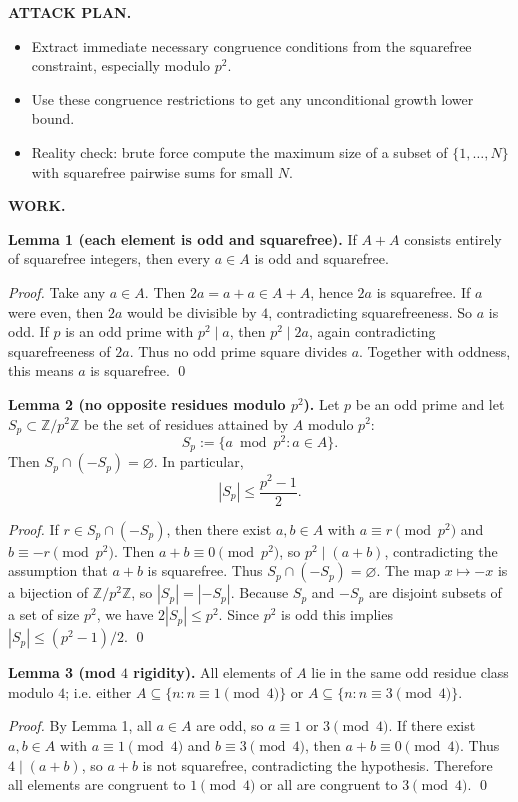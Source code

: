 \medskip
\noindent\textbf{ATTACK PLAN.}
\begin{itemize}
\item Extract immediate necessary congruence conditions from the squarefree constraint, especially modulo $p^2$.
\item Use these congruence restrictions to get any unconditional growth lower bound.
\item Reality check: brute force compute the maximum size of a subset of $\{1,\dots,N\}$ with squarefree pairwise sums for small $N$.
\end{itemize}

\medskip
\noindent\textbf{WORK.}

\medskip
\noindent\textbf{Lemma 1 (each element is odd and squarefree).}
If $A+A$ consists entirely of squarefree integers, then every $a\in A$ is odd and squarefree.

\noindent\emph{Proof.}
Take any $a\in A$. Then $2a=a+a\in A+A$, hence $2a$ is squarefree.
If $a$ were even, then $2a$ would be divisible by $4$, contradicting squarefreeness.
So $a$ is odd.
If $p$ is an odd prime with $p^2\mid a$, then $p^2\mid 2a$, again contradicting squarefreeness of $2a$.
Thus no odd prime square divides $a$.
Together with oddness, this means $a$ is squarefree. \qed

\medskip
\noindent\textbf{Lemma 2 (no opposite residues modulo $p^2$).}
Let $p$ be an odd prime and let $S_p\subset\mathbb Z/p^2\mathbb Z$ be the set of residues attained by $A$ modulo $p^2$:
\[S_p:=\{a\bmod p^2: a\in A\}.
\]
Then $S_p\cap(-S_p)=\varnothing$. In particular,
\[|S_p|\le \frac{p^2-1}{2}.
\]

\noindent\emph{Proof.}
If $r\in S_p\cap(-S_p)$, then there exist $a,b\in A$ with
$a\equiv r\pmod{p^2}$ and $b\equiv -r\pmod{p^2}$.
Then $a+b\equiv 0\pmod{p^2}$, so $p^2\mid(a+b)$, contradicting the assumption that $a+b$ is squarefree.
Thus $S_p\cap(-S_p)=\varnothing$.
The map $x\mapsto -x$ is a bijection of $\mathbb Z/p^2\mathbb Z$, so $|S_p|=|-S_p|$.
Because $S_p$ and $-S_p$ are disjoint subsets of a set of size $p^2$, we have $2|S_p|\le p^2$.
Since $p^2$ is odd this implies $|S_p|\le (p^2-1)/2$. \qed

\medskip
\noindent\textbf{Lemma 3 (mod $4$ rigidity).}
All elements of $A$ lie in the same odd residue class modulo $4$; i.e. either $A\subseteq\{n: n\equiv 1\pmod 4\}$ or $A\subseteq\{n: n\equiv 3\pmod 4\}$.

\noindent\emph{Proof.}
By Lemma 1, all $a\in A$ are odd, so $a\equiv 1$ or $3\pmod 4$.
If there exist $a,b\in A$ with $a\equiv 1\pmod 4$ and $b\equiv 3\pmod 4$, then $a+b\equiv 0\pmod 4$.
Thus $4\mid(a+b)$, so $a+b$ is not squarefree, contradicting the hypothesis.
Therefore all elements are congruent to $1\pmod 4$ or all are congruent to $3\pmod 4$. \qed

